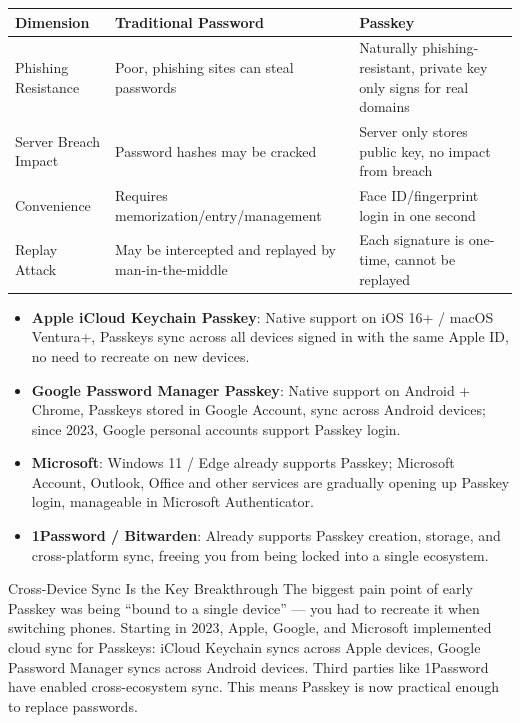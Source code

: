\begin{center}
\begin{tabularx}{\linewidth}{|X|X|X|}
\hline
\textbf{Dimension} & \textbf{Traditional Password} & \textbf{Passkey} \tabularnewline
\hline
Phishing Resistance & Poor, phishing sites can steal passwords & Naturally phishing-resistant, private key only signs for real domains \tabularnewline
Server Breach Impact & Password hashes may be cracked & Server only stores public key, no impact from breach \tabularnewline
Convenience & Requires memorization/entry/management & Face ID/fingerprint login in one second \tabularnewline
Replay Attack & May be intercepted and replayed by man-in-the-middle & Each signature is one-time, cannot be replayed \tabularnewline
\hline
\end{tabularx}
\end{center}


\begin{itemize}
  \item \textbf{Apple iCloud Keychain Passkey}: Native support on iOS 16+ / macOS Ventura+, Passkeys sync across all devices signed in with the same Apple ID, no need to recreate on new devices.
  \item \textbf{Google Password Manager Passkey}: Native support on Android + Chrome, Passkeys stored in Google Account, sync across Android devices; since 2023, Google personal accounts support Passkey login.
  \item \textbf{Microsoft}: Windows 11 / Edge already supports Passkey; Microsoft Account, Outlook, Office and other services are gradually opening up Passkey login, manageable in Microsoft Authenticator.
  \item \textbf{1Password / Bitwarden}: Already supports Passkey creation, storage, and cross-platform sync, freeing you from being locked into a single ecosystem.
\end{itemize}

\begin{tcbinfo}{Cross-Device Sync Is the Key Breakthrough}
The biggest pain point of early Passkey was being “bound to a single device” — you had to recreate it when switching phones. Starting in 2023, Apple, Google, and Microsoft implemented cloud sync for Passkeys: iCloud Keychain syncs across Apple devices, Google Password Manager syncs across Android devices. Third parties like 1Password have enabled cross-ecosystem sync. This means Passkey is now practical enough to replace passwords.

\end{tcbinfo}

